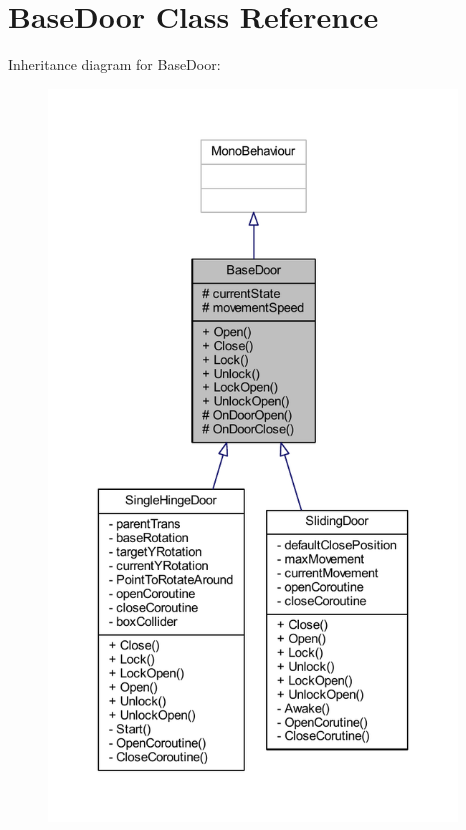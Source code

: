 \hypertarget{class_base_door}{}\section{Base\+Door Class Reference}
\label{class_base_door}


Inheritance diagram for Base\+Door\+:
\nopagebreak
\begin{figure}[H]
\begin{center}
\leavevmode
\includegraphics[height=550pt]{class_base_door__inherit__graph}
\end{center}
\end{figure}



